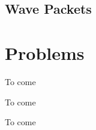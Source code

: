 
\subsection{Wave Packets}



%
%







\section*{Problems}
%

\begin{problem}
\label{prob_finite_depth}
To come
\end{problem}

\begin{problem}
\label{prob_grav_cap_dispersion}
To come
\end{problem}

\begin{problem}
\label{prob_two_cosines}
To come
\end{problem}

